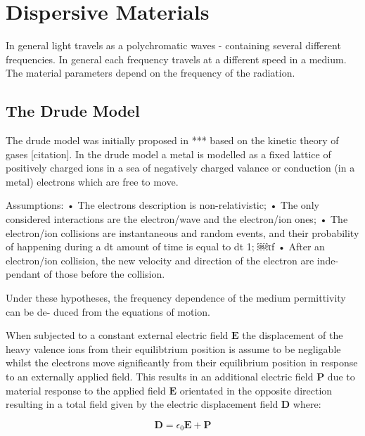 
\chapter{Dispersive Materials} %
\label{Chapter4}

In general light travels as a polychromatic waves - containing several different frequencies. In general each frequency travels at a different speed in a medium. The material parameters depend on the frequency of the radiation.

\section{The Drude Model}

The drude model was initially proposed in *** based on the kinetic theory of gases [citation]. In the drude model a metal is modelled as a fixed lattice of positively charged ions in a sea of negatively charged valance or conduction (in a metal) electrons which are free to move.

Assumptions:
• The electrons description is non-relativistic;
• The only considered interactions are the electron/wave and the electron/ion ones;
• The electron/ion collisions are instantaneous and random events, and their probability of happening during a dt amount of time is equal to dt 1;
￼τf
• After an electron/ion collision, the new velocity and direction of the electron are inde-
pendant of those before the collision.


Under these hypotheses, the frequency dependence of the medium permittivity can be de- duced from the equations of motion.

When subjected to a constant external electric field $\mathbf{E}$ the displacement of the heavy valence ions from their equilibtrium position is assume to be negligable whilst the electrons move significantly from their equilibrium position in response to an externally applied field. This results in an additional electric field $\mathbf{P}$ due to material response to the applied field $\mathbf{E}$ orientated in the opposite direction resulting in a total field given by the electric displacement field $\mathbf{D}$ where:

$$
\mathbf{D} = \epsilon_0 \mathbf{E} + \mathbf{P}
$$

